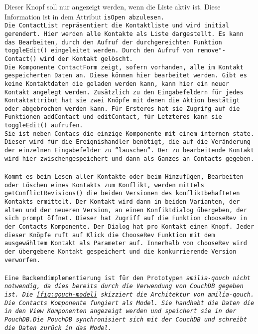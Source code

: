 Dieser Knopf soll nur angezeigt werden, wenn die Liste aktiv ist. Diese Information ist in dem  Attribut \tt{isOpen} abzulesen.\\
Die \tt{ContactList} repräsentiert die Kontaktliste und wird initial gerendert. Hier werden alle Kontakte als Liste dargestellt.
Es kann das Bearbeiten, durch den Aufruf der durchgereichten Funktion \tt{toggleEdit()} eingeleitet werden. Durch den Aufruf von \tt{remove"-Contact()} wird der Kontakt gelöscht.\\
%
Die Komponente \tt{ContactForm} zeigt, sofern vorhanden, alle im Kontakt gespeicherten Daten an.
Diese können hier bearbeitet werden.
Gibt es keine Kontaktdaten die geladen werden kann, kann hier ein neuer Kontakt angelegt werden.
Zusätzlich zu den Eingabefeldern für jedes Kontaktattribut hat sie zwei Knöpfe mit denen die Aktion bestätigt oder abgebrochen werden kann.
Für Ersteres hat sie Zugrifg auf die Funktionen \tt{addContact} und \tt{editContact}, für Letzteres kann sie \tt{toggleEdit()} aufrufen.\\
Sie ist neben \tt{Contacs} die einzige Komponente mit einem internen \tt{state}.
Dieser wird für die Ereignishandler benötigt, die auf die Veränderung der einzelnen Eingabefelder zu ''lauschen''. Der zu bearbeitende Kontakt wird hier zwischengespeichert und dann als Ganzes an \tt{Contacts} gegeben.\\
\\
Kommt es beim Lesen aller Kontakte oder beim Hinzufügen, Bearbeiten oder Löschen eines Kontakts zum Konflikt, werden mittels \tt{getConflictRevisions()} die beiden Versionen des konfliktbehafteten Kontakts ermittelt. Der Kontakt wird dann in beiden Varianten, der alten und der neueren Version, an einen Konfiktdialog übergeben, der sich prompt öffnet. Dieser hat Zugriff auf die Funktion \tt{chooseRev} in der \tt{Contacts} Komponente. Der Dialog hat pro Kontakt einen Knopf. Jeder dieser Knöpfe ruft auf Klick die \tt{ChooseRev} Funktion mit dem ausgewähltem Kontakt als Parameter auf.
Innerhalb von \tt{chooseRev} wird der übergebene Kontakt gespeichert und die konkurrierende Version verworfen.\\\\
%
% 
%
Eine Backendimplementierung ist für den Prototypen \it{amilia-qouch} nicht notwendig, da dies bereits durch die Verwendung von CouchDB gegeben ist.
Die \autoref{fig:qouch-model} skizziert die Architektur von \it{amilia-qouch}. Die Contacts Komponente fungiert als Model. Sie handhabt die Daten die in den View Komponenten angezeigt werden und speichert sie in der PouchDB.Die PouchDB synchronisiert sich mit der CouchDB und schreibt die Daten zurück in das Model.  
